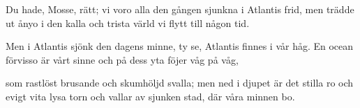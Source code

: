\beginverse*
Du hade, Mosse, rätt; vi voro alla
den gången sjunkna i Atlantis frid,
men trädde ut ånyo i den kalla
och trista värld vi flytt till någon tid.
\endverse

\beginverse*
Men i Atlantis sjönk den dagens minne,
ty se, Atlantis finnes i vår håg.
En ocean förvisso är vårt sinne
och på dess yta föjer våg på våg,
\endverse

\beginverse*
som rastlöst brusande och skumhöljd svalla;
men ned i djupet är det stilla ro
och evigt vita lysa torn och vallar
av sjunken stad, där våra minnen bo.
\endverse
\endsong